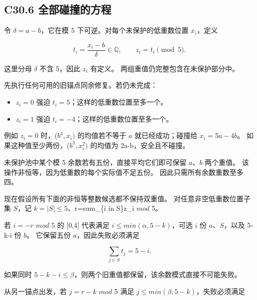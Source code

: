 \documentclass[11pt,a4paper]{article}
\newcommand{\tightlist}{\setlength{\itemsep}{0pt}\setlength{\parskip}{0pt}}
\theoremstyle{definition}
\numberwithin{equation}{section}
\begin{document}
\subsection*{\texorpdfstring{{C30.6} {全部碰撞的方程}}{C30.6 全部碰撞的方程}}\label{C30-h196}

{令} {\ensuremath{\delta =a-b}，它在模} {5} {下可逆。对每个未保护的低重数位置} {\ensuremath{x_{i}}，定义}

\[
t_i=\frac{x_i-b}{\delta}\in\mathbb Q,
\qquad z_i=t_i\pmod5.
\]

{这里分母} {\ensuremath{\delta }} {不含} {5，因此} {\ensuremath{z_{i}}} {有定义。} {两组重值仍完整包含在未保护部分中。}

{先执行任何可用的旧锚点同余修复。若仍未完成：}

\begin{itemize}
\tightlist
\item
  {\ensuremath{z_{i}=0}} {强迫} {\ensuremath{t_{i}=5}；这样的低重数位置至多一个。}
\item
  {\ensuremath{z_{i}=1}} {强迫} {\ensuremath{t_{i}=-4}；这样的低重数位置至多一个。}
\end{itemize}

{例如} {\ensuremath{z_{i}=0}} {时，(\ensuremath{b^{4},x_{i})}} {的均值若不等于} {\ensuremath{a}} {就已经成功；碰撞给} {\ensuremath{x_{i}=5a-4b}。} {如果这种值至少两份，(\ensuremath{b^{3},x_{i}^{2})}} {的均值为} {2a-b，安全且不碰撞。}

{未保护池中某个模} {5} {余数若有五份，直接平均它们即可保留} {\ensuremath{a}、\ensuremath{b}} {两个重值。} {该操作非恒等，因为低重数的每个实际值不足五份。} {因此只需所有余数重数至多四。}

{现在假设所有下面的非恒等整数候选都不保持双重值。} {对任意非空低重数位置子集} {\ensuremath{S}，记} {\ensuremath{k=|S|\le 5}、r=sum\_\{i} {in} {S\}z\_i} {\ensuremath{mod}} {5。}

{若} {\ensuremath{i=-r}} {\ensuremath{mod}} {5} {的} {{[}0,4{]}} {代表满足} {\ensuremath{i\le min(\alpha ,5-k)}，可选} {\ensuremath{i}} {份} {\ensuremath{a}、\ensuremath{S}，以及} {5-k-i} {份} {\ensuremath{b}。} {它保留五份} {\ensuremath{a}，因此失败必须满足}

\[
\sum_{j\in S}t_j=5-i.
\tag{C30.5}
\]

{如果同时} {\ensuremath{5-k-i\le \beta }，则两个旧重值都保留，该余数模式直接不可能失败。}

{从另一锚点出发，若} {\ensuremath{j=r-k}} {\ensuremath{mod}} {5} {满足} {\ensuremath{j\le min(\beta ,5-k)}，失败必须满足}
\end{document}
